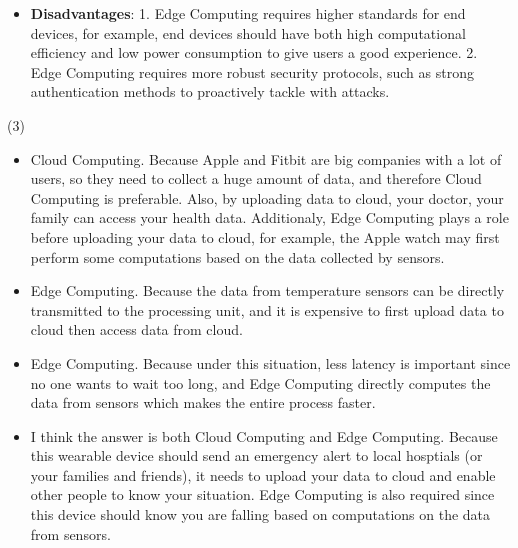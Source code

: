 \documentclass[11pt]{article}
\begin{document}
\begin{solution}
\begin{itemize}
\item \textbf{Disadvantages}: 1. Edge Computing requires higher standards for end devices, for example, end devices should have both high computational efficiency and low power consumption to give users a good experience. 2. Edge Computing requires more robust security protocols, such as strong authentication methods to proactively tackle with attacks.
\end{itemize}
\pagebreak
\item (3)
\begin{itemize}
\item Cloud Computing. Because Apple and Fitbit are big companies with a lot of users, so they need to collect a huge amount of data, and therefore Cloud Computing is preferable. Also, by uploading data to cloud, your doctor, your family can access your health data. Additionaly, Edge Computing plays a role before uploading your data to cloud, for example, the Apple watch may first perform some computations based on the data collected by sensors.
\item Edge Computing. Because the data from temperature sensors can be directly transmitted to the processing unit, and it is expensive to first upload data to cloud then access data from cloud.
\item Edge Computing. Because under this situation, less latency is important since no one wants to wait too long, and Edge Computing directly computes the data from sensors which makes the entire process faster.
\item I think the answer is both Cloud Computing and Edge Computing. Because this wearable device should send an emergency alert to local hosptials (or your families and friends), it needs to upload your data to cloud and enable other people to know your situation. Edge Computing is also required since this device should know you are falling based on computations on the data from sensors.
\end{itemize}

\end{solution}
\end{document}

